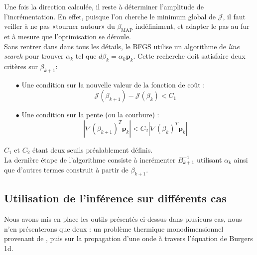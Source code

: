 \documentclass[a4paper,12pt]{article}
\newcommand{\bepar}[1]{
	\left( #1 \right)  
}
\newcommand{\bmap}{\beta_{\text{MAP}}}
\newcommand{\J}{\mathcal{J}}
\newcommand\bk{\color{black}}
\newcommand\brick{\color{brick}}
\numberwithin{equation}{section} %
\begin{document}
\noindent Une fois la direction calculée, il reste à déterminer l'amplitude de l'incrémentation. En effet, puisque l'on cherche le minimum global de $\J$, il faut veiller à ne pas «tourner autour» du $\bmap$ indéfiniment, et adapter le pas au fur et à mesure que l'optimisation se déroule.\\ 
Sans rentrer dans dans tous les détails, le BFGS utilise un algorithme de \textit{line search} pour trouver $ \displaystyle \alpha_k$ tel que $d\beta_k = \alpha_k\mathbf{p}_k$. Cette recherche doit satisfaire deux critères sur $\beta_{k+1}$: 
\begin{itemize}
\item[$\bullet$] Une condition sur la nouvelle valeur de la fonction de coût : \begin{equation}
\J\bepar{\beta_{k+1}} - \J\bepar{\beta_k} < C_1
\end{equation} 

\item[$\bullet$] Une condition sur la pente (ou la courbure) : 
\begin{equation}
|\nabla(\beta_{k+1})^T\textbf{p}_k| < C_2 |\nabla\bepar{\beta_k}^T\textbf{p}_k|
\end{equation}
\end{itemize} 
$C_1$ et $C_2$ étant deux seuils préalablement définis.\\
La dernière étape de l'algorithme consiste à incrémenter $B_{k+1}^{-1}$ utilisant $\alpha_k$ ainsi que d'autres termes construit à partir de $\beta_{k+1}$.\\

\pagebreak

\brick \subsection{Utilisation de l'inférence sur différents cas} \bk

Nous avons mis en place les outils présentés ci-dessus dans plusieurs cas, nous n'en présenterons que deux : un problème thermique monodimensionnel provenant de \citep{parish2016paradigm}, puis sur la propagation d'une onde à travers l'équation de Burgers 1d.
\end{document}
